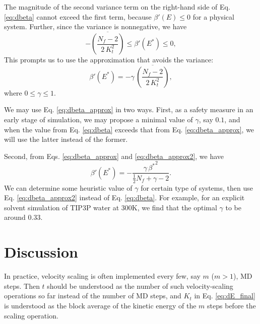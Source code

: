 \documentclass[reprint]{revtex4-1}
\begin{document}
The magnitude of the second variance term on the right-hand side
of Eq. \eqref{eq:dbeta}
cannot exceed the first term,
because $\beta'(E) \le 0$ for a physical system.
%
Further, since the variance is nonnegative, we have
%
\begin{equation*}
  - \overline{
    \left(
      \frac{ N_f - 2 }
           { 2 \, K_t^2 }
    \right)
    }
  \le
  \beta'(E^*)
  \le
  0,
\end{equation*}
%
This prompts us to use the approximation
that avoids the variance:
%
\begin{equation}
  \beta'(E^*)
  =
  -\gamma \, \overline{
    \left(
      \frac{ N_f - 2 }
           { 2 \, K_t^2 }
    \right)
    }
  ,
  \label{eq:dbeta_approx}
\end{equation}
%
where $0 \le \gamma \le 1$.


We may use Eq. \eqref{eq:dbeta_approx} in two ways.
%
First, as a safety measure in an early stage of simulation,
we may propose a minimal value of $\gamma$, say $0.1$,
and when the value from Eq. \eqref{eq:dbeta}
exceeds that from Eq. \eqref{eq:dbeta_approx},
we will use the latter instead of the former.

Second, from
Eqs. \eqref{eq:dbeta_approx} and \eqref{eq:dbeta_approx2},
we have
%
\begin{equation}
  \beta'(E^*)
  =
  -\frac{ \gamma \, {\beta^*}^2 }
  { \frac{1}{2} N_f + \gamma - 2 }
  .
  \label{eq:dbeta_approx2}
\end{equation}
%
We can determine some heuristic value of $\gamma$
for certain type of systems,
then use Eq. \eqref{eq:dbeta_approx2}
instead of Eq. \eqref{eq:dbeta}.
%
For example,
for an explicit solvent simulation of TIP3P water\cite{jorgensen1983}
at 300K, we find that the optimal $\gamma$
to be around $0.33$.



\section{Discussion}




In practice, velocity scaling is often implemented every few,
say $m$ ($m > 1$), MD steps.
%
Then $t$ should be understood as the number of
such velocity-scaling operations so far instead of
the number of MD steps, and $K_t$ in Eq. \eqref{eq:dE_final} is understood
as the block average of the kinetic energy of the $m$ steps
before the scaling operation.
\end{document}
